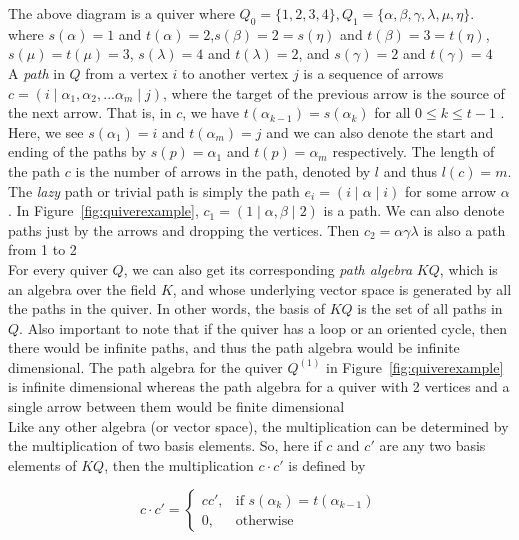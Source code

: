 \documentclass{amsart}
\numberwithin{figure}{section}
\begin{document}
 The above diagram is a quiver where $Q_0=\{1,2,3,4\},Q_1=\{\alpha,\beta,\gamma,\lambda,\mu,\eta\}$. where $s(\alpha)=1$ and $t(\alpha)=2$,$s(\beta)=2=s(\eta)$ and $t(\beta)=3=t(\eta)$, $s(\mu)=t(\mu)=3$, $s(\lambda)=4$ and $t(\lambda)=2$, and $s(\gamma)=2$ and $t(\gamma)=4$\\


 A \textit{path} in $Q$ from a vertex $i$ to another vertex $j$ is a sequence of arrows  $c=(i\mid\alpha_1,\alpha_2,...\alpha_m\mid j)$, where the target of the previous arrow is the source of the next arrow. That is, in $c$, we have $t(\alpha_{k-1})=s(\alpha_k)$ for all $0\leq k \leq t-1$ . Here, we see $s(\alpha_1)=i$ and $t(\alpha_{m})=j$ and we can also denote the start and ending of the paths by $s(p)=\alpha_1$ and $t(p)=\alpha_m$ respectively. The length of the path $c$ is the number of arrows in the path, denoted by $l$ and thus $l(c)=m$. The \textit{lazy} path or trivial path is simply the path $e_i=(i\mid \alpha \mid i)$ for some arrow $\alpha$. In Figure~\ref{fig:quiverexample}, $c_1=(1\mid \alpha,\beta\mid 2)$ is a path. We can also denote paths just by the arrows and dropping the vertices. Then $c_2=\alpha\gamma\lambda$ is also a path from 1 to 2\\
 

 For every quiver $Q$, we can also get its corresponding \textit{path algebra} $KQ$, which is an algebra over the field $K$, and whose underlying vector space is generated by all the paths in the quiver. In other words, the basis of $KQ$ is the set of all paths in $Q$. Also important to note that if the quiver has a loop or an oriented cycle, then there would be infinite paths, and thus the path algebra would be infinite dimensional. The path algebra for the quiver $Q^{(1)}$ in Figure~\ref{fig:quiverexample} is infinite dimensional whereas the path algebra for a quiver with 2 vertices and a single arrow between them would be finite dimensional\\
 
 Like any other algebra (or vector space), the multiplication can be determined by the multiplication of two basis elements. So, here if $c$ and $c'$ are any two basis elements of $KQ$, then the multiplication $c \cdot c'$ is defined by 

 \[
c \cdot c' = 
\begin{cases}c  c' , & \text{if } s(\alpha_k)=t(\alpha_{k-1}) \\
0, & \text{otherwise }
\end{cases}
\]
\end{document}
